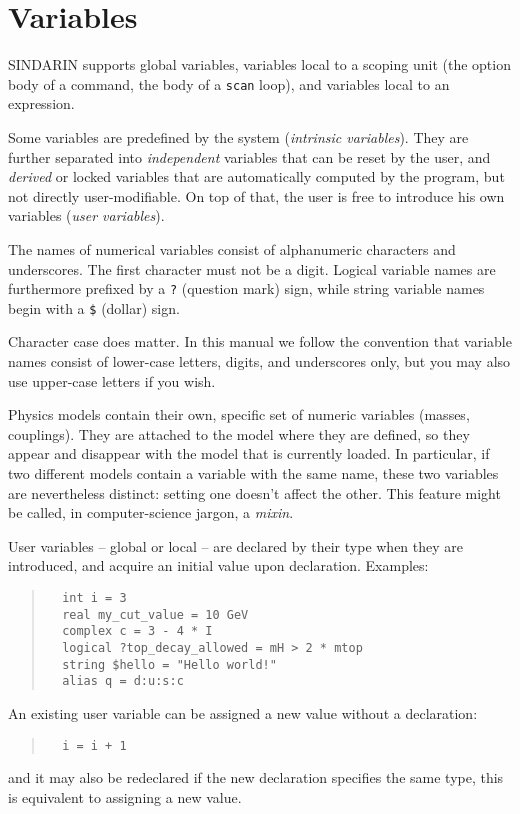 \documentclass[12pt]{book}
\newcommand{\ttt}[1]{\texttt{#1}}
\begin{document}
\section{Variables}
\label{sec:variables}

SINDARIN supports global variables, variables local to a scoping unit (the
option body of a command, the body of a \ttt{scan} loop), and variables local
to an expression.

Some variables are predefined by the system (\emph{intrinsic
  variables}).  They are further separated into \emph{independent}
variables that can be reset by the user, and \emph{derived} or locked
variables that are automatically computed by the program, but not
directly user-modifiable.  On top of that, the user is free to
introduce his own variables (\emph{user variables}).

The names of numerical variables consist of alphanumeric characters and
underscores.  The first character must not be a digit.  Logical
variable names are furthermore prefixed by a
\ttt{?} (question mark) sign, while string variable names begin
with a \ttt{\$} (dollar) sign. 

Character case does matter.  In this manual we follow the
convention that variable names consist of lower-case letters,
digits, and underscores only, but you may also use upper-case
letters if you wish.

Physics models contain their own, specific set of numeric variables
(masses, couplings).  They are attached to the model where they are
defined, so they appear and disappear with the model that is currently
loaded.  In particular, if two different models contain a variable
with the same name, these two variables are nevertheless distinct:
setting one doesn't affect the other.  This feature might be called,
in computer-science jargon, a \emph{mixin}.

User variables -- global or local -- are declared by their type when they are
introduced, and acquire an initial value upon declaration.  Examples:
\begin{quote}
\begin{footnotesize}
\begin{verbatim}
  int i = 3
  real my_cut_value = 10 GeV
  complex c = 3 - 4 * I
  logical ?top_decay_allowed = mH > 2 * mtop
  string $hello = "Hello world!"
  alias q = d:u:s:c
\end{verbatim}
\end{footnotesize}
\end{quote}
An existing user variable can be assigned a new value without a declaration:
\begin{quote}
\begin{footnotesize}
\begin{verbatim}
  i = i + 1
\end{verbatim}
\end{footnotesize}
\end{quote}
and it may also be redeclared if the new declaration specifies the same type,
this is equivalent to assigning a new value.
\end{document}

